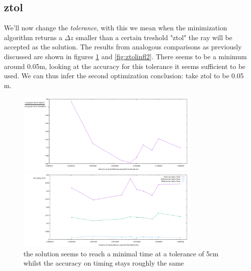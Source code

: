 \subsection{ztol}
We'll now change the \textit{tolerance}, with this we mean when 
the minimization algorithm returns a $\Delta z$ smaller than a certain
treshold "ztol" the ray will be accepted as the solution.  
The results from analogous comparisons as
previously discussed are shown in figures \ref{fig:ztolinfl} and
\ref{fig:ztolinfl2}.  There seems to be a minimum around 0.05m, looking at the
accuracy for this tolerance it seems sufficient to be used.  We can thus infer
the second optimization conclusion: take ztol to be 0.05 m.
\begin{figure}
	\centering
	\begin{minipage}{\textwidth}
		\includegraphics[width=0.8\textwidth]{figures/ZtolVsTime2.pdf}
	\end{minipage}
	\begin{minipage}{\textwidth}
		\includegraphics[width=0.8\textwidth]{figures/ZtolVsSigmaTime.pdf}
	\end{minipage}
\caption{the solution seems to reach a minimal time at a tolerance of 5cm whilst the accuracy on timing stays roughly the same}
\label{fig:ztolinfl}
\end{figure}

